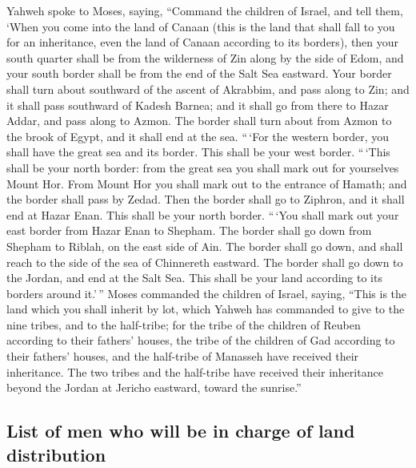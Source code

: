  Yahweh spoke to Moses, saying,  ``Command
the children of Israel, and tell them, `When you come into the land of
Canaan (this is the land that shall fall to you for an inheritance, even
the land of Canaan according to its borders),  then your
south quarter shall be from the wilderness of Zin along by the side of
Edom, and your south border shall be from the end of the Salt Sea
eastward.  Your border shall turn about southward of the
ascent of Akrabbim, and pass along to Zin; and it shall pass southward
of Kadesh Barnea; and it shall go from there to Hazar Addar, and pass
along to Azmon.  The border shall turn about from Azmon to
the brook of Egypt, and it shall end at the sea.  ``\,`For
the western border, you shall have the great sea and its border. This
shall be your west border.  ``\,`This shall be your north
border: from the great sea you shall mark out for yourselves Mount Hor.
 From Mount Hor you shall mark out to the entrance of
Hamath; and the border shall pass by Zedad.  Then the
border shall go to Ziphron, and it shall end at Hazar Enan. This shall
be your north border.  ``\,`You shall mark out your east
border from Hazar Enan to Shepham.  The border shall go
down from Shepham to Riblah, on the east side of Ain. The border shall
go down, and shall reach to the side of the sea of Chinnereth eastward.
 The border shall go down to the Jordan, and end at the
Salt Sea. This shall be your land according to its borders around
it.'\,''  Moses commanded the children of Israel, saying,
``This is the land which you shall inherit by lot, which Yahweh has
commanded to give to the nine tribes, and to the half-tribe;
 for the tribe of the children of Reuben according to
their fathers' houses, the tribe of the children of Gad according to
their fathers' houses, and the half-tribe of Manasseh have received
their inheritance.  The two tribes and the half-tribe
have received their inheritance beyond the Jordan at Jericho eastward,
toward the sunrise.''

\hypertarget{list-of-men-who-will-be-in-charge-of-land-distribution}{%
\subsection{List of men who will be in charge of land
distribution}\label{list-of-men-who-will-be-in-charge-of-land-distribution}}

